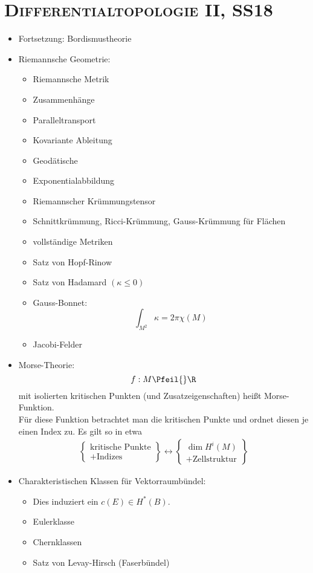 \chapter{\textsc{Differentialtopologie II}, SS18}
\begin{itemize}
	\item Fortsetzung: Bordismustheorie
	\item Riemannsche Geometrie:
	\begin{itemize}
		\item Riemannsche Metrik
		\item Zusammenhänge
		\item Paralleltransport
		\item Kovariante Ableitung
		\item Geodätische
		\item Exponentialabbildung
		\item Riemannscher Krümmungstensor
		\item Schnittkrümmung, Ricci-Krümmung, Gauss-Krümmung für Flächen
		\item vollständige Metriken
		\item Satz von Hopf-Rinow
		\item Satz von Hadamard $(\kappa \leq 0)$
		\item {Gauss-Bonnet}:
		\[ \int_{M^2} \kappa = 2\pi \chi(M) \]
		\item Jacobi-Felder
	\end{itemize}
	\item Morse-Theorie:
	\[ f: M \Pfeil{} \R \]
	mit isolierten kritischen Punkten (und Zusatzeigenschaften) heißt Morse-Funktion.\\
	Für diese Funktion betrachtet man die kritischen Punkte und ordnet diesen je einen Index zu. Es gilt so in etwa
	\begin{align*}
	\left\lbrace
	\begin{aligned}
	\text{kritische Punkte}\\
	+ \text{Indizes}
	\end{aligned}
	\right\rbrace
	\longleftrightarrow
	\left\lbrace
	\begin{aligned}
	\dim H^i(M)\\
	+\text{Zellstruktur}
	\end{aligned}
	\right\rbrace
	\end{align*}
	
	\item Charakteristischen Klassen für Vektorraumbündel:
	\begin{itemize}
		\item {}
		Dies induziert ein $c(E) \in H^*(B)$.
		\item Eulerklasse
		\item Chernklassen
		\item Satz von Levay-Hirsch (Faserbündel)
	\end{itemize}
\end{itemize}